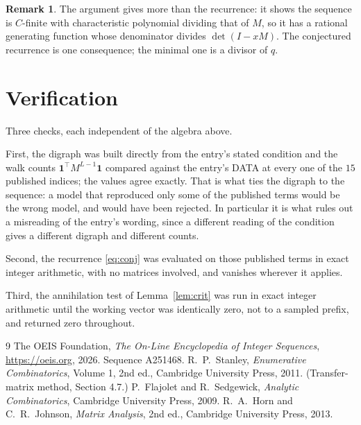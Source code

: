 \documentclass[11pt,a4paper]{article}
\theoremstyle{plain}
\theoremstyle{definition}
\newtheorem{remark}[theorem]{Remark}
\begin{document}
\begin{remark}
The argument gives more than the recurrence: it shows the sequence is $C$-finite with
characteristic polynomial dividing that of $M$, so it has a rational generating function
whose denominator divides $\det(I-xM)$. The conjectured recurrence is one consequence; the
minimal one is a divisor of $q$.
\end{remark}

\section{Verification}

Three checks, each independent of the algebra above.

First, the digraph was built directly from the entry's stated condition and the walk counts
$\mathbf{1}^{\!\top}M^{L-1}\mathbf{1}$ compared against the entry's DATA at
every one of the $15$ published indices; the values agree exactly. That is what ties
the digraph to the sequence: a model that reproduced only some of the published terms would
be the wrong model, and would have been rejected. In particular it is what rules out a
misreading of the entry's wording, since a different reading of the condition gives a
different digraph and different counts.

Second, the recurrence \eqref{eq:conj} was evaluated on those published terms in exact
integer arithmetic, with no matrices involved, and vanishes wherever it applies.

Third, the annihilation test of Lemma~\ref{lem:crit} was run in exact integer arithmetic
until the working vector was identically zero, not to a sampled prefix, and returned zero
throughout.

\begin{thebibliography}{9}
 The OEIS Foundation, \emph{The On-Line Encyclopedia of Integer
Sequences}, \url{https://oeis.org}, 2026. Sequence A251468.
 R.~P.~Stanley, \emph{Enumerative Combinatorics}, Volume 1, 2nd ed.,
Cambridge University Press, 2011. (Transfer-matrix method, Section 4.7.)
 P.~Flajolet and R.~Sedgewick, \emph{Analytic Combinatorics}, Cambridge
University Press, 2009.
 R.~A.~Horn and C.~R.~Johnson, \emph{Matrix Analysis}, 2nd ed., Cambridge
University Press, 2013.
\end{thebibliography}
\end{document}
